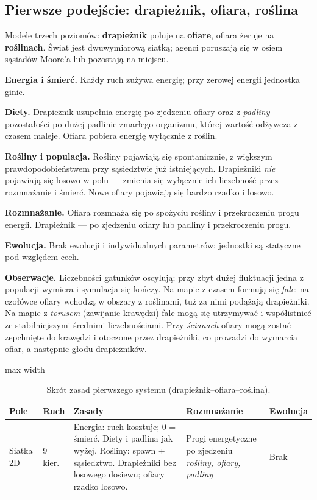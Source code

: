 \documentclass[polish]{template/projectreport}
\begin{document}
\subsection{Pierwsze podejście: drapieżnik, ofiara, roślina}

Modele trzech poziomów: \textbf{drapieżnik} poluje na \textbf{ofiare}, ofiara żeruje na \textbf{roślinach}.
Świat jest dwuwymiarową siatką; agenci poruszają się w osiem sąsiadów Moore'a lub pozostają na miejscu.

\textbf{Energia i śmierć.} Każdy ruch zużywa energię; przy zerowej energii jednostka ginie.

\textbf{Diety.} Drapieżnik uzupełnia energię po zjedzeniu ofiary oraz z \emph{padliny} --- pozostałości po dużej padlinie zmarłego organizmu, której wartość odżywcza z czasem maleje.
Ofiara pobiera energię wyłącznie z roślin.

\textbf{Rośliny i populacja.} Rośliny pojawiają się spontanicznie, z większym prawdopodobieństwem przy sąsiedztwie już istniejących.
Drapieżniki \emph{nie} pojawiają się losowo w polu --- zmienia się wyłącznie ich liczebność przez rozmnażanie i śmierć.
Nowe ofiary pojawiają się bardzo rzadko i losowo.

\textbf{Rozmnażanie.} Ofiara rozmnaża się po spożyciu rośliny i przekroczeniu progu energii.
Drapieżnik --- po zjedzeniu ofiary lub padliny i przekroczeniu progu.

\textbf{Ewolucja.} Brak ewolucji i indywidualnych parametrów: jednostki są statyczne pod względem cech.

\textbf{Obserwacje.} Liczebności gatunków oscylują; przy zbyt dużej fluktuacji jedna z populacji wymiera i symulacja się kończy.
Na mapie z czasem formują się \emph{fale}: na czołówce ofiary wchodzą w obszary z roślinami, tuż za nimi podążają drapieżniki.
Na mapie z \emph{torusem} (zawijanie krawędzi) fale mogą się utrzymywać i współistnieć ze stabilniejszymi średnimi liczebnościami.
Przy \emph{ścianach} ofiary mogą zostać zepchnięte do krawędzi i otoczone przez drapieżniki, co prowadzi do wymarcia ofiar, a następnie głodu drapieżników.

\begin{table}[htbp]
  \centering
  \caption{Skrót zasad pierwszego systemu (drapieżnik--ofiara--roślina).}
  \label{tab:sys1}
  \footnotesize
  \begin{adjustbox}{max width=\linewidth}
  \begin{tabular}{@{}p{1.6cm}p{1.4cm}p{4.8cm}p{2.5cm}p{1.7cm}@{}}
    \toprule
    Pole & Ruch & Zasady & Rozmnażanie & Ewolucja \\
    \midrule
    Siatka 2D & 9 kier. & Energia: ruch kosztuje; 0 = śmierć. Diety i padlina jak wyżej. Rośliny: spawn + sąsiedztwo. Drapieżniki bez losowego dosiewu; ofiary rzadko losowo. & Progi energetyczne po zjedzeniu \emph{rośliny, ofiary, padliny} & Brak \\
    \bottomrule
  \end{tabular}
  \end{adjustbox}
\end{table}
\end{document}
